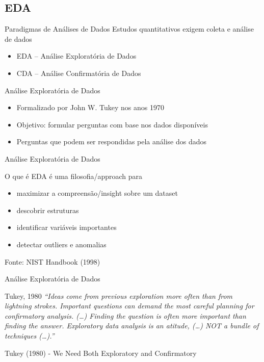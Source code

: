 \documentclass{beamer}
\begin{document}
\subsection{EDA}

\begin{frame}{Paradigmas de Análises de Dados}
Estudos quantitativos exigem coleta e análise de dados
  \begin{itemize}
  \item EDA -- Análise Exploratória de Dados
  \item CDA -- Análise Confirmatória de Dados
  \end{itemize}
\end{frame}

\begin{frame}{Análise Exploratória de Dados}
  \begin{itemize}
  \item<1-> Formalizado por John W. Tukey nos anos 1970
  \item<1-> Objetivo: formular perguntas com base nos dados disponíveis
  \item<2-> Perguntas que podem ser respondidas pela análise dos dados
  \end{itemize}
\end{frame}

\begin{frame}{Análise Exploratória de Dados}
  \begin{block}{O que é}
    EDA é uma filosofia/approach para
    \begin{itemize}
    \item maximizar a compreensão/insight sobre um dataset
    \item descobrir estruturas
    \item identificar variáveis importantes
    \item detectar outliers e anomalias
    \end{itemize}
  \end{block}
  Fonte: NIST Handbook (1998)
\end{frame}

\begin{frame}{Análise Exploratória de Dados}
  \begin{block}{Tukey, 1980}
    {\em ``Ideas come from previous exploration more often than from
      lightning strokes. Important questions can demand the most
      careful planning for confirmatory analysis. (\ldots) Finding the
      question is often more important than finding the
      answer. Exploratory data analysis is an atitude, (\ldots) NOT a
      bundle of techniques (\ldots).''}
  \end{block}

Tukey (1980) - We Need Both Exploratory and Confirmatory
\end{frame}
\end{document}
